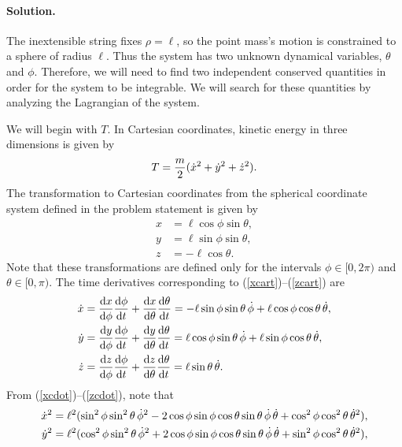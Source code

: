 \documentclass[11pt]{article}
\newcommand{\refeq}[1]{(\ref{#1})}
\newenvironment{solution}
{
    \paragraph{Solution.}
    \ignorespaces
}
{
    \bigskip
}
\begin{document}
\newcommand{\phid}{\dot{\phi}}
\newcommand{\thetad}{\dot{\theta}}

\begin{solution}
	The inextensible string fixes $\rho = \ell$, so the point mass's motion is constrained to a sphere of radius $\ell$.  Thus the system has two unknown dynamical variables, $\theta$ and $\phi$.  Therefore, we will need to find two independent conserved quantities in order for the system to be integrable.  We will search for these quantities by analyzing the Lagrangian of the system.
	
	We will begin with $T$.  In Cartesian coordinates, kinetic energy in three dimensions is given by
	\begin{equation} \label{Tcart}
		T = \frac{m}{2} (\dot{x}^2 + \dot{y}^2 + \dot{z}^2).
	\end{equation}
	The transformation to Cartesian coordinates from the spherical coordinate system defined in the problem statement is given by
	\begin{align}
		x &= \ell \cos{\phi} \sin{\theta}, \label{xcart} \\
		y &= \ell \sin{\phi} \sin{\theta}, \label{ycart} \\
		z &= -\ell \cos{\theta}. \label{zcart}
	\end{align}
	Note that these transformations are defined only for the intervals $\phi \in [0, 2\pi)$ and $\theta \in [0, \pi)$.  The time derivatives corresponding to \refeq{xcart}--\refeq{zcart} are
	\begin{align}
		\xd &= \dv{x}{\phi} \dv{\phi}{t} + \dv{x}{\theta} \dv{\theta}{t} = -\ell \sin{\phi} \sin{\theta} \,\phid + \ell \cos{\phi} \cos{\theta} \,\thetad, \label{xcdot} \\
		\yd &= \dv{y}{\phi} \dv{\phi}{t} + \dv{y}{\theta} \dv{\theta}{t} = \ell \cos{\phi} \sin{\theta} \,\phid + \ell \sin{\phi} \cos{\theta} \,\thetad, \label{ycdot} \\
		\zd &= \dv{z}{\phi} \dv{\phi}{t} + \dv{z}{\theta} \dv{\theta}{t} = \ell \sin{\theta} \,\thetad. \label{zcdot}
	\end{align}
	From \refeq{xcdot}--\refeq{zcdot}, note that
	\begin{align}
	\xd^2 &= \ell^2 (\sin^2{\phi} \sin^2{\theta} \,\phid^2 - 2 \cos{\phi} \sin{\phi} \cos{\theta} \sin{\theta} \,\phid \,\thetad + \cos^2{\phi} \cos^2{\theta} \,\thetad^2), \label{xcdot2} \\
	\yd^2 &= \ell^2 (\cos^2{\phi} \sin^2{\theta} \,\phid^2 + 2 \cos{\phi} \sin{\phi} \cos{\theta} \sin{\theta} \,\phid \,\thetad + \sin^2{\phi} \cos^2{\theta} \,\thetad^2), \label{ycdot2} \\

\end{align}
\end{solution}
\end{document}
